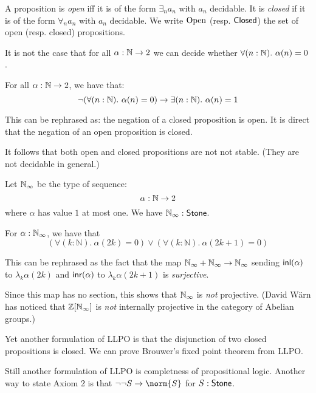 A proposition is {\em open} iff it is of the form $\exists_n a_n$ with $a_n$ decidable.
It is {\em closed} if it is of the form $\forall_n a_n$ with $a_n$ decidable.
We write $\mathrm{Open}$ (resp. $\mathsf{Closed}$) the set of open (resp. closed) propositions.


\begin{theorem}
   It is not the case that for all $\alpha:\mathbb{N}\to 2$ we can decide whether $\forall (n:\mathbb{N}).\ \alpha(n)=0$.
\end{theorem}

\begin{theorem}
  For all $\alpha:\mathbb{N}\to 2$, we have that:
   \[\neg(\forall (n:\mathbb{N}).\ \alpha(n)=0) \to \exists (n:\mathbb{N}).\ \alpha(n)=1\]
\end{theorem}

This can be rephrased as: the negation of a closed proposition is open. It is direct that the negation
of an open proposition is closed.

It follows that both open and closed propositions are not not stable. (They are not decidable in general.)

\begin{definition}
Let $\mathbb{N}_{\infty}$ be the type of sequence:
\[\alpha:\mathbb{N}\to 2\]
where $\alpha$ has value $1$ at most one. We have $\mathbb{N}_{\infty}:\mathsf{Stone}$.
\end{definition}

\begin{theorem}
  For $\alpha:\mathbb {\mathbb{N}_{\infty}}$, 
  we have that 
  \begin{equation}\label{eqnLLPO}
    \left(\forall (k:\mathbb N).\ \alpha(2k) = 0 \right) \vee \left(\forall (k:\mathbb N).\ \alpha(2k+1) = 0\right)
  \end{equation}
\end{theorem}

This can be rephrased as the fact that the map $\mathbb{N}_{\infty}+\mathbb{N}_{\infty}\rightarrow \mathbb{N}_{\infty}$ sending $\mathsf{inl}(\alpha)$ to $\lambda_k \alpha(2k)$
and $\mathsf{inr}(\alpha)$ to $\lambda_k \alpha(2k+1)$ is {\em surjective}.

\medskip

Since this map has no section, this shows that $\mathbb{N}_{\infty}$ is {\em not} projective.
(David W\"arn has noticed that $\mathbb{Z}[\mathbb{N}_{\infty}]$ is {\em not} internally projective in the category of
Abelian groups.)

\medskip

 Yet another formulation of LLPO is that the disjunction of two closed propositions is closed.
 We can prove Brouwer's fixed point theorem from LLPO.

Still another formulation of LLPO is completness of propositional logic. Another way to state
Axiom 2 is that $\neg\neg S\rightarrow \norm{S}$ for $S:\mathsf{Stone}$.


 
